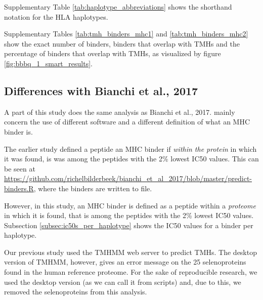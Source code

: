 Supplementary Table \ref{tab:haplotype_abbreviations} shows the
shorthand notation for the HLA haplotypes.



Supplementary Tables \ref{tab:tmh_binders_mhc1} and \ref{tab:tmh_binders_mhc2}
show the exact number of binders, binders that overlap with TMHs
and the percentage of binders that overlap with TMHs, as
visualized by figure \ref{fig:bbbq_1_smart_results}.

\clearpage

\subsection{Differences with Bianchi et al., 2017}

A part of this study does the same analysis as Bianchi et al., 2017.
mainly concern the use of different
software and a different definition of what an MHC binder is.


The earlier study defined a peptide an MHC binder 
if \emph{within the protein} in which it was found, 
is was among the peptides with the 2\% lowest IC50 values.
This can be seen at \url{https://github.com/richelbilderbeek/bianchi_et_al_2017/blob/master/predict-binders.R},
where the binders are written to file.

However, in this study, an MHC binder is defined as a peptide within a \emph{proteome} in which it is found, that is among the peptides with the 2\% lowest IC50 values.
Subsection \ref{subsec:ic50s_per_haplotype} shows the IC50 values
for a binder per haplotype. 


Our previous study used the TMHMM web server
to predict TMHs.
The desktop version of TMHMM, however, gives an
error message on the 25 selenoproteins found in the human
reference proteome.
For the sake of reproducible research, we used the desktop version (as
we can call it from scripts) and, due to this, we removed the
selenoproteins from this analysis.


